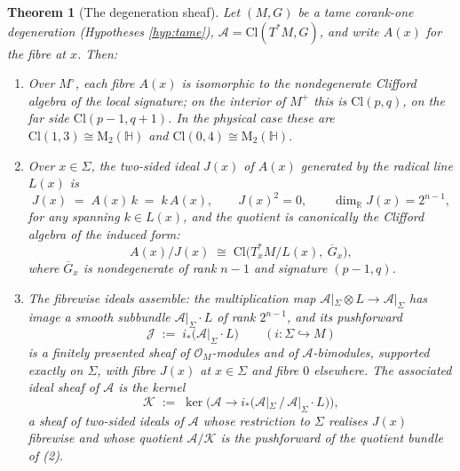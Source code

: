 \documentclass[11pt]{article}
\newtheorem{theorem}{Theorem}[section]
\theoremstyle{definition}
\newcommand{\Cl}{\mathrm{Cl}}
\newcommand{\R}{\mathbb{R}}
\newcommand{\HH}{\mathbb{H}}
\newcommand{\Mat}{\mathrm{M}}
\newcommand{\shA}{\mathcal{A}}
\newcommand{\shJ}{\mathcal{J}}
\newcommand{\shK}{\mathcal{K}}
\newcommand{\shL}{L}
\newcommand{\Sig}{\Sigma}
\newcommand{\Mo}{M^{\circ}}
\newcommand{\Mp}{M^{+}}
\begin{document}
\begin{theorem}[The degeneration sheaf]\label{thm:degsheaf}
Let $(M, G)$ be a tame corank-one degeneration (Hypotheses \ref{hyp:tame}), $\shA = \Cl(T^*M, G)$, and write $A(x)$ for the fibre at $x$. Then:
\begin{enumerate}
\item Over $\Mo$, each fibre $A(x)$ is isomorphic to the nondegenerate Clifford algebra of the local signature; on the interior of $\Mp$ this is $\Cl(p,q)$, on the far side $\Cl(p{-}1,q{+}1)$. In the physical case these are $\Cl(1,3) \cong \Mat_2(\HH)$ and $\Cl(0,4) \cong \Mat_2(\HH)$.
\item Over $x \in \Sig$, the two-sided ideal $J(x)$ of $A(x)$ generated by the radical line $\shL(x)$ is
\[
J(x) \;=\; A(x)\,k \;=\; k\,A(x), \qquad J(x)^2 = 0, \qquad \dim_\R J(x) = 2^{n-1},
\]
for any spanning $k \in \shL(x)$, and the quotient is canonically the Clifford algebra of the induced form:
\[
A(x)/J(x) \;\cong\; \Cl\bigl(T^*_xM / \shL(x),\ \overline{G}_x\bigr),
\]
where $\overline{G}_x$ is nondegenerate of rank $n-1$ and signature $(p{-}1, q)$.
\item The fibrewise ideals assemble: the multiplication map $\shA|_\Sig \otimes \shL \to \shA|_\Sig$ has image a smooth subbundle $\shA|_\Sig \cdot \shL$ of rank $2^{n-1}$, and its pushforward
\[
\shJ \;:=\; i_*\bigl(\shA|_\Sig \cdot \shL\bigr) \qquad (i : \Sig \hookrightarrow M)
\]
is a finitely presented sheaf of $\mathcal{O}_M$-modules and of $\shA$-bimodules, supported exactly on $\Sig$, with fibre $J(x)$ at $x \in \Sig$ and fibre $0$ elsewhere. The associated ideal sheaf of $\shA$ is the kernel
\[
\shK \;:=\; \ker\bigl(\shA \longrightarrow i_*\bigl(\shA|_\Sig \,/\, \shA|_\Sig \cdot \shL\bigr)\bigr),
\]
a sheaf of two-sided ideals of $\shA$ whose restriction to $\Sig$ realises $J(x)$ fibrewise and whose quotient $\shA/\shK$ is the pushforward of the quotient bundle of (2).
\end{enumerate}
\end{theorem}
\end{document}
